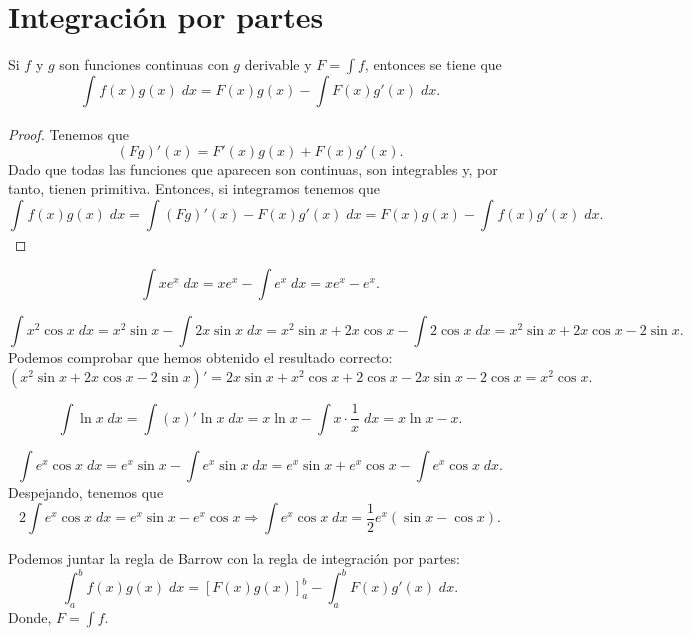 \section{Integración por partes}
\begin{ftheorem}
\normalfont Si $\displaystyle f $ y $\displaystyle g $ son funciones continuas con $\displaystyle g $ derivable y $\displaystyle F = \int f $, entonces se tiene que 
\[ \int^{}_{} f\left(x\right)g\left(x\right) \; dx = F\left(x\right)g\left(x\right) - \int F\left(x\right)g'\left(x\right) \; dx .\]
\end{ftheorem}
\begin{proof}
Tenemos que 
\[ \left(Fg\right)'\left(x\right) = F'\left(x\right)g\left(x\right) + F\left(x\right)g'\left(x\right) .\]
Dado que todas las funciones que aparecen son continuas, son integrables y, por tanto, tienen primitiva. Entonces, si integramos tenemos que 
\[ \int^{}_{} f\left(x\right)g\left(x\right) \; dx = \int^{}_{} \left(Fg\right)'\left(x\right)- F\left(x\right)g'\left(x\right) \; dx = F\left(x\right)g\left(x\right) - \int^{}_{} f\left(x\right)g'\left(x\right) \; dx.\] 
\end{proof}
\begin{eg}
\normalfont 
\[\int xe^{x} \; dx = xe^{x}-\int e^{x} \; dx = xe^{x} - e^{x} .\]
\end{eg}
\begin{eg}
\normalfont 
\[\int x^{2}\cos x \; dx = x^{2}\sin x - \int 2x\sin x  \; dx = x^{2}\sin x + 2x \cos x - \int 2\cos x \; dx = x^{2}\sin x + 2x \cos x - 2\sin x .\]
Podemos comprobar que hemos obtenido el resultado correcto:
\[ \left(x^{2}\sin x + 2x \cos x - 2\sin x \right)' = 2x \sin x + x^{2}\cos x + 2 \cos x - 2x \sin x - 2 \cos x = x^{2}\cos x.\]
\end{eg}
\begin{eg}
\normalfont 
\[\int \ln x \; dx = \int \left(x\right)'\ln x \; dx = x\ln x - \int x \cdot \frac{1}{x} \; dx = x \ln x - x .\]
\end{eg}
\begin{eg}
\normalfont 
\[ \int e^{x} \cos x \; dx = e^{x}\sin x - \int e^{x}\sin x \; dx = e^{x}\sin x + e^{x}\cos x - \int e^{x}\cos x \; dx .\]
Despejando, tenemos que
\[2\int e^{x}\cos x \; dx = e^{x}\sin x- e^{x}\cos x \Rightarrow \int e^{x}\cos x  \; dx = \frac{1}{2}e^{x}\left(\sin x - \cos x\right).\]
\end{eg}
\begin{observation}
\normalfont Podemos juntar la regla de Barrow con la regla de integración por partes:
\[ \int^{b}_{a} f\left(x\right)g\left(x\right) \; dx = \left[F\left(x\right)g\left(x\right)\right] ^{b}_{a}-\int^{b}_{a} F\left(x\right)g'\left(x\right) \; dx  .\]
Donde, $\displaystyle F = \int f $.
\end{observation}
